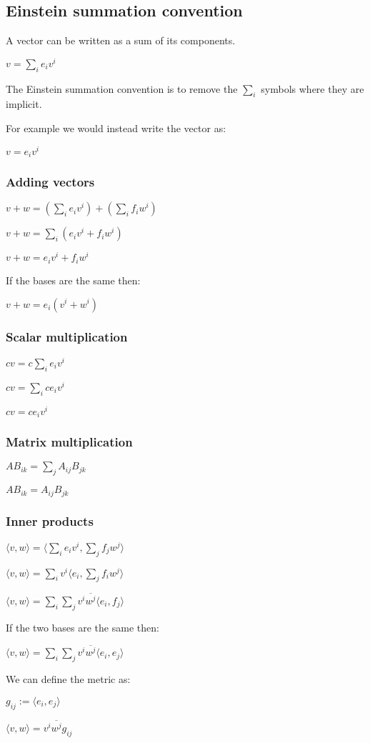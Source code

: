 
\subsection{Einstein summation convention}

A vector can be written as a sum of its components.

\(v=\sum_i e_i v^i\)

The Einstein summation convention is to remove the \(\sum_i \) symbols where they are implicit.

For example we would instead write the vector as:

\(v=e_iv^i\)

\subsubsection{Adding vectors}

\(v+w=(\sum_i e_i v^i)+(\sum_i f_iw^i)\)

\(v+w=\sum_i (e_iv^i+f_iw^i)\)

\(v+w=e_iv^i+f_iw^i\)

If the bases are the same then:

\(v+w=e_i (v^i+w^i)\)

\subsubsection{Scalar multiplication}

\(cv=c\sum_ie_iv^i\)

\(cv=\sum_i ce_iv^i\)

\(cv=ce_iv^i\)

\subsubsection{Matrix multiplication}

\(AB_{ik}=\sum_jA_{ij}B_{jk}\)

\(AB_{ik}=A_{ij}B_{jk}\)

\subsubsection{Inner products}

\(\langle v, w\rangle =\langle \sum_i e_iv^i, \sum_j f_jw^j\rangle \)

\(\langle v, w\rangle =\sum_iv^i\langle  e_i, \sum_j f_iw^j\rangle \)

\(\langle v, w\rangle =\sum_i \sum_jv^i\overline {w^j}\langle e_i, f_j\rangle\)

If the two bases are the same then:

\(\langle v, w\rangle =\sum_i \sum_jv^i\overline {w^j}\langle e_i, e_j\rangle\)

We can define the metric as:

\(g_{ij}:=\langle e_i,e_j\rangle \)

\(\langle v, w\rangle =v^i\overline {w^j}g_{ij}\)

